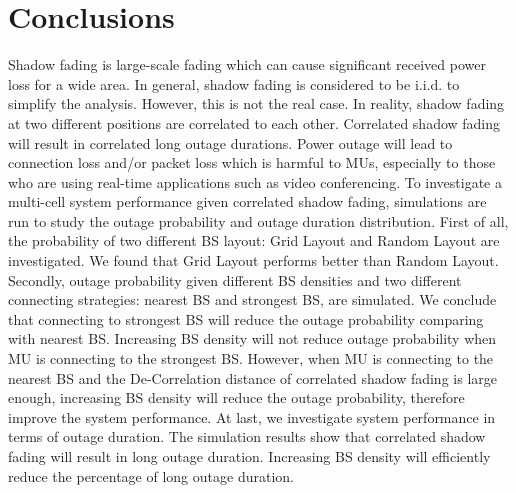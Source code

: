 \section{Conclusions}
\label{Conclusion}
Shadow fading is large-scale fading which can cause significant received power loss for a wide area. In general, shadow fading is considered to be i.i.d. to simplify the analysis. However, this is not the real case. In reality, shadow fading at two different positions are correlated to each other. Correlated shadow fading will result in correlated long outage durations. Power outage will lead to connection loss and/or packet loss which is harmful to MUs, especially to those who are using real-time applications such as video conferencing. To investigate a multi-cell system performance given correlated shadow fading, simulations are run to study the outage probability and outage duration distribution. First of all, the probability of two different BS layout: Grid Layout and Random Layout are investigated. We found that Grid Layout performs better than Random Layout. Secondly, outage probability given different BS densities and two different connecting strategies: nearest BS and strongest BS, are simulated. We conclude that connecting to strongest BS will reduce the outage probability comparing with nearest BS. Increasing BS density will not reduce outage probability when MU is connecting to the strongest BS. However, when MU is connecting to the nearest BS and the De-Correlation distance of correlated shadow fading is large enough, increasing BS density will reduce the outage probability, therefore improve the system performance. At last, we investigate system performance in terms of outage duration. The simulation results show that correlated shadow fading will result in long outage duration. Increasing BS density will efficiently reduce the percentage of long outage duration.
 

